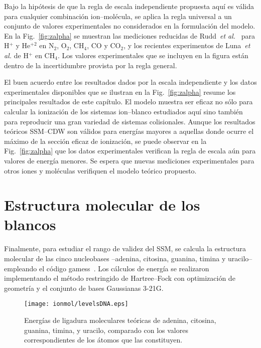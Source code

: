 Bajo la hipótesis de que la regla de escala independiente propuesta aquí 
es válida para cualquier combinación ion--molécula, se aplica la regla 
universal a un conjunto de valores experimentales no considerados en la
formulación del modelo. En la Fig.~\ref{fig:zalpha} se muestran 
las mediciones reducidas de Rudd~\textit{et al.}~\cite{Rudd:85,Rudd:83} 
para H$^{+}$ y He$^{+2}$ en N$_2$, O$_2$, CH$_4$, CO y CO$_2$, y los 
recientes experimentos de Luna~\textit{et al.} \cite{Luna2019} de 
H$^{+}$ en CH$_4$. Los valores experimentales que se incluyen en la 
figura están dentro de la incertidumbre provista por la regla general.

El buen acuerdo entre los resultados dados por la escala independiente y 
los datos experimentales disponibles que se ilustran en la 
Fig.~\ref{fig:zalpha} resume los principales resultados de este 
capítulo. El modelo muestra ser eficaz no sólo para calcular la 
ionización de los sistemas ion--blanco estudiados aquí sino también 
para reproducir una gran variedad de sistemas colisionales. Aunque los 
resultados teóricos SSM--CDW son válidos para energías mayores a 
aquellas donde ocurre el máximo de la sección eficaz de ionización, 
se puede observar en la Fig.~\ref{fig:zalpha} que los datos 
experimentales verifican la regla de escala aún para valores de energía 
menores. Se espera que nuevas mediciones experimentales para otros 
iones y moléculas verifiquen el modelo teórico propuesto.

\section{Estructura molecular de los blancos}
\label{sec:molcalculations}

Finalmente, para estudiar el rango de validez del SSM, se calcula la 
estructura molecular de las cinco nucleobases --adenina, citosina, 
guanina, timina y uracilo-- empleando el código 
{\sc gamess}~\cite{gamess}. Los 
cálculos de energía se realizaron implementando el método restringido de 
Hartree--Fock con optimización de geometría y el conjunto de bases 
Gaussianas 3-21G. 

\begin{figure}[t]
\centering
\texttt{[image: ionmol/levelsDNA.eps]}
\caption[Energías de ligadura moleculares teóricas de ADN y ARN.]
{Energías de ligadura moleculares teóricas de adenina, citosina, 
guanina, timina, y uracilo, comparado con los valores correspondientes 
de los átomos que las constituyen.}
\label{fig:ADNbindener}
\end{figure}

